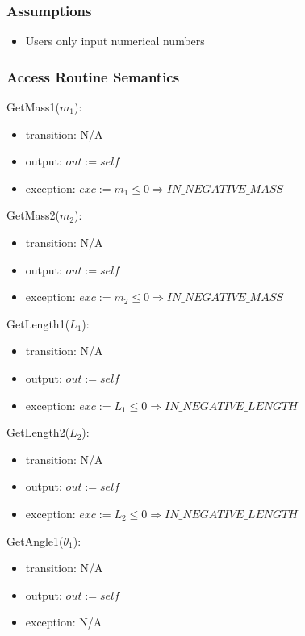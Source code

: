 \documentclass[12pt, titlepage]{article}
\begin{document}
\subsubsection{Assumptions}
\begin{itemize}
  \item Users only input numerical numbers
\end{itemize}

\subsubsection{Access Routine Semantics}

\noindent GetMass1($m_1$):
\begin{itemize}
\item transition: N/A
\item output: $out := self$
\item exception: $exc := m_1 \leq 0 \Rightarrow IN\_NEGATIVE\_MASS$
\end{itemize}

\noindent GetMass2($m_2$):
\begin{itemize}
\item transition: N/A
\item output: $out := self$
\item exception: $exc := m_2 \leq 0 \Rightarrow IN\_NEGATIVE\_MASS$
\end{itemize}

\noindent GetLength1($L_1$):
\begin{itemize}
\item transition: N/A
\item output: $out := self$
\item exception: $exc := L_1 \leq 0 \Rightarrow IN\_NEGATIVE\_LENGTH$
\end{itemize}

\noindent GetLength2($L_2$):
\begin{itemize}
\item transition: N/A
\item output: $out := self$
\item exception: $exc := L_2 \leq 0 \Rightarrow IN\_NEGATIVE\_LENGTH$
\end{itemize}

\noindent GetAngle1($\theta_1$):
\begin{itemize}
\item transition: N/A
\item output: $out := self$
\item exception: N/A
\end{itemize}
\end{document}
